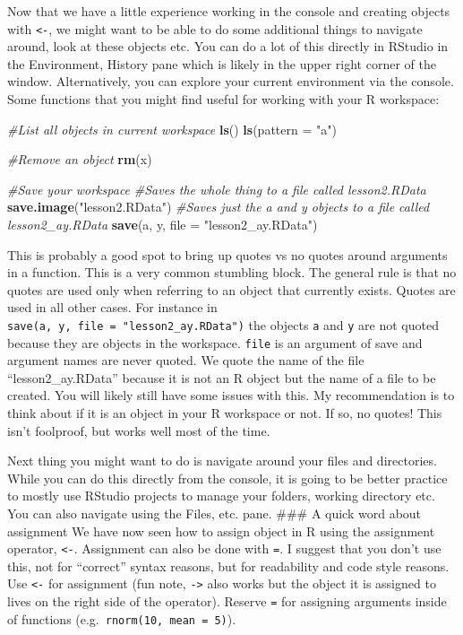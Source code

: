 \documentclass[]{article}
\newenvironment{Shaded}{\begin{snugshade}}{\end{snugshade}}
\newcommand{\CommentTok}[1]{\textcolor[rgb]{0.56,0.35,0.01}{\textit{#1}}}
\newcommand{\DataTypeTok}[1]{\textcolor[rgb]{0.13,0.29,0.53}{#1}}
\newcommand{\KeywordTok}[1]{\textcolor[rgb]{0.13,0.29,0.53}{\textbf{#1}}}
\newcommand{\NormalTok}[1]{#1}
\newcommand{\StringTok}[1]{\textcolor[rgb]{0.31,0.60,0.02}{#1}}
\begin{document}
Now that we have a little experience working in the console and creating
objects with \texttt{\textless{}-}, we might want to be able to do some
additional things to navigate around, look at these objects etc. You can
do a lot of this directly in RStudio in the Environment, History pane
which is likely in the upper right corner of the window. Alternatively,
you can explore your current environment via the console. Some functions
that you might find useful for working with your R workspace:

\begin{Shaded}
\begin{Highlighting}[]
\CommentTok{#List all objects in current workspace}
\KeywordTok{ls}\NormalTok{() }
\KeywordTok{ls}\NormalTok{(}\DataTypeTok{pattern =} \StringTok{"a"}\NormalTok{)}

\CommentTok{#Remove an object}
\KeywordTok{rm}\NormalTok{(x)}

\CommentTok{#Save your workspace}
\CommentTok{#Saves the whole thing to a file called lesson2.RData}
\KeywordTok{save.image}\NormalTok{(}\StringTok{"lesson2.RData"}\NormalTok{) }
\CommentTok{#Saves just the a and y objects to a file called lesson2_ay.RData}
\KeywordTok{save}\NormalTok{(a, y, }\DataTypeTok{file =} \StringTok{"lesson2_ay.RData"}\NormalTok{)}
\end{Highlighting}
\end{Shaded}

This is probably a good spot to bring up quotes vs no quotes around
arguments in a function. This is a very common stumbling block. The
general rule is that no quotes are used only when referring to an object
that currently exists. Quotes are used in all other cases. For instance
in \texttt{save(a,\ y,\ file\ =\ "lesson2\_ay.RData")} the objects
\texttt{a} and \texttt{y} are not quoted because they are objects in the
workspace. \texttt{file} is an argument of save and argument names are
never quoted. We quote the name of the file ``lesson2\_ay.RData''
because it is not an R object but the name of a file to be created. You
will likely still have some issues with this. My recommendation is to
think about if it is an object in your R workspace or not. If so, no
quotes! This isn't foolproof, but works well most of the time.

Next thing you might want to do is navigate around your files and
directories. While you can do this directly from the console, it is
going to be better practice to mostly use RStudio projects to manage
your folders, working directory etc. You can also navigate using the
Files, etc. pane. \#\#\# A quick word about assignment We have now seen
how to assign object in R using the assignment operator,
\texttt{\textless{}-}. Assignment can also be done with \texttt{=}. I
suggest that you don't use this, not for ``correct'' syntax reasons, but
for readability and code style reasons. Use \texttt{\textless{}-} for
assignment (fun note, \texttt{-\textgreater{}} also works but the object
it is assigned to lives on the right side of the operator). Reserve
\texttt{=} for assigning arguments inside of functions
(e.g.~\texttt{rnorm(10,\ mean\ =\ 5)}).
\end{document}
